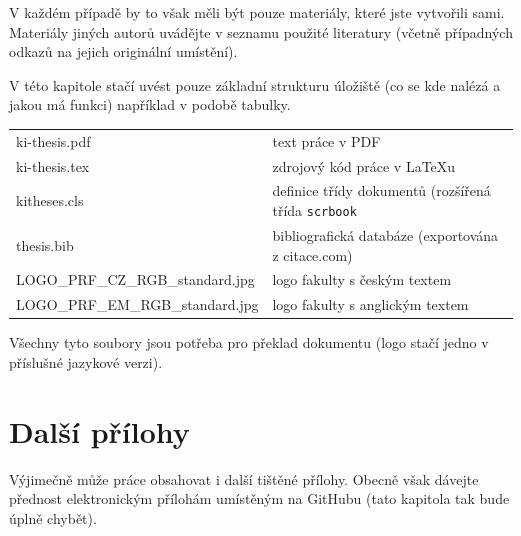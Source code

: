 \documentclass[male,czech,api_bc]{kitheses}
\begin{document}
V každém případě by to však měli být pouze materiály, které jste vytvořili sami. Materiály jiných autorů uvádějte v seznamu použité literatury (včetně případných odkazů na jejich originální umístění).

V této kapitole stačí uvést pouze základní strukturu úložiště (co se kde nalézá a jakou má funkci) například v podobě tabulky. 

\begin{longtable}{ll}
\hline
ki-thesis.pdf & text práce v PDF \\
ki-thesis.tex & zdrojový kód práce v \LaTeX{}u \\
kitheses.cls & definice třídy dokumentů (rozšířená třída \texttt{scrbook} \\
thesis.bib & bibliografická databáze (exportována z citace.com) \\
LOGO\_PRF\_CZ\_RGB\_standard.jpg  & logo fakulty s českým textem \\
LOGO\_PRF\_EM\_RGB\_standard.jpg  & logo fakulty s anglickým textem  \\
\hline
\end{longtable}

Všechny tyto soubory jsou potřeba pro překlad dokumentu (logo stačí jedno v příslušné jazykové verzi).

\chapter{Další přílohy}

Výjimečně může práce obsahovat i další tištěné přílohy. Obecně však dávejte přednost elektronickým přílohám umístěným na GitHubu (tato kapitola tak bude úplně chybět). 
\end{document}
